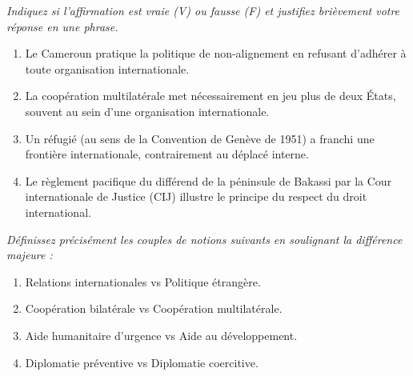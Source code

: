 \documentclass[11pt]{article}
\newcommand{\cle}[1]{{\popxbold\color{popdark}#1}}
\begin{document}
\begin{exercice}
\emph{Indiquez si l'affirmation est vraie (V) ou fausse (F) et justifiez brièvement votre réponse en une phrase.}
\begin{enumerate}
    \item Le Cameroun pratique la politique de \cle{non-alignement} en refusant d'adhérer à toute organisation internationale.
    \item La \cle{coopération multilatérale} met nécessairement en jeu plus de deux États, souvent au sein d'une organisation internationale.
    \item Un \cle{réfugié} (au sens de la Convention de Genève de 1951) a franchi une frontière internationale, contrairement au \cle{déplacé interne}.
    \item Le règlement pacifique du différend de la \cle{péninsule de Bakassi} par la Cour internationale de Justice (CIJ) illustre le principe du respect du droit international.
\end{enumerate}
\end{exercice}

\begin{exercice}
\emph{Définissez précisément les couples de notions suivants en soulignant la différence majeure :}
\begin{enumerate}
    \item \cle{Relations internationales} vs \cle{Politique étrangère}.
    \item \cle{Coopération bilatérale} vs \cle{Coopération multilatérale}.
    \item \cle{Aide humanitaire d'urgence} vs \cle{Aide au développement}.
    \item \cle{Diplomatie préventive} vs \cle{Diplomatie coercitive}.
\end{enumerate}
\end{exercice}
\end{document}
